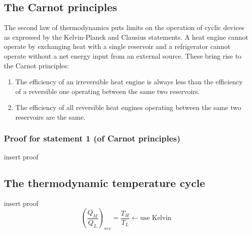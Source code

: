 \documentclass[class=report, crop=false, 12pt,a4paper]{standalone}
\begin{document}
\subsection{The Carnot principles}
The second law of thermodynamics puts limits on the operation of cyclic devices as expressed by the Kelvin-Planck and Clausius statements. A heat engine cannot operate by exchanging heat with a single reservoir and a refrigerator cannot operate without a net energy input from an external source. These bring rise to the Carnot principles:
\begin{enumerate}[noitemsep]
  \item The efficiency of an irreversible heat engine is always less than the efficiency of a reversible one operating between the same two reservoirs.
  \item The efficiency of all reversible heat engines operating between the same two reservoirs are the same.
\end{enumerate}
\subsubsection{Proof for statement 1 (of Carnot principles)}
insert proof
\subsection{The thermodynamic temperature cycle}
insert proof
\begin{equation} 
  \left( \frac{Q_M}{Q_L} \right)_{rev} = \frac{T_H}{T_L} \leftarrow \textrm{use Kelvin} 
\end{equation}
\end{document}
